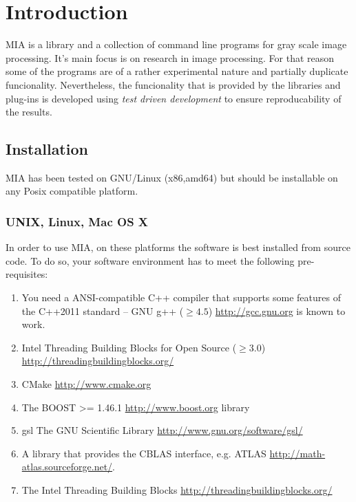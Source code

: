 \documentclass[english, 10pt, a4paper,headsepline,openany]{book}
\begin{document}
\pagestyle{headings}


\chapter{Introduction}

MIA is a library and a collection of command line programs for gray scale image processing. 
It's main focus is on research in image processing.
For that reason some of the programs are of a rather experimental nature and partially 
   duplicate funcionality. 
Nevertheless, the funcionality that is provided by the libraries and plug-ins is developed 
  using \emph{test driven development} to ensure reproducability of the results.
 


\section{Installation}

MIA has been tested on GNU/Linux (x86,amd64) but should be installable on any Posix compatible platform. 


\subsection{UNIX, Linux, Mac OS X} 

In order to use MIA, on these platforms the software is best installed from source code. 
To do so, your software environment has to meet the following pre-requisites: 

\begin{enumerate}
\item You need a ANSI-compatible C++ compiler that supports some features of the C++2011 standard 
        -- GNU g++ ($\ge 4.5$) \url{http://gcc.gnu.org} is known to work. 
\item Intel Threading Building Blocks for Open Source ($\ge 3.0$) \url{http://threadingbuildingblocks.org/} 
\item CMake \url{http://www.cmake.org}
\item The BOOST >= 1.46.1 \url{http://www.boost.org} library
\item gsl The GNU Scientific Library \url{http://www.gnu.org/software/gsl/}
\item A library that provides the CBLAS interface, e.g. ATLAS \url{http://math-atlas.sourceforge.net/}.
\item The Intel Threading Building Blocks \url{http://threadingbuildingblocks.org/}
\end{enumerate}
\end{document}
